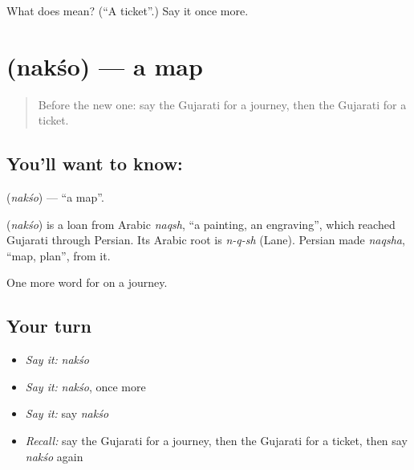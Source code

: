 \begin{tcolorbox}[breakable,colback=teal!4,colframe=teal!35!black,title={Before you move on}]
What does  mean? (\textquotedblleft{}A ticket\textquotedblright{}.) Say it once more.
\end{tcolorbox}
\section[\texorpdfstring{\gu{નકશો} (nakśo)}{નકશો (nakśo)}]{ (nakśo) — a map}

\label{lesson:GU-C86-map}



\begin{quote}
Before the new one: say the Gujarati for a journey, then the Gujarati for a ticket.
\end{quote}

\subsection*{You'll want to know: }
\textbf{} (\emph{nakśo}) — \textquotedblleft{}a map\textquotedblright{}.

\begin{cousinweb}
\textbf{} (\emph{nakśo}) is a loan from Arabic \emph{naqsh}, \textquotedblleft{}a painting, an engraving\textquotedblright{}, which reached Gujarati through Persian. Its Arabic root is \emph{n-q-sh} (Lane). Persian made \emph{naqsha}, \textquotedblleft{}map, plan\textquotedblright{}, from it.
\end{cousinweb}

\begin{grammarlens}[title={What you've built}]
One more word for on a journey.
\end{grammarlens}

\subsection*{Your turn}
\begin{itemize}
\raggedright
  \item \emph{Say it:} \emph{nakśo}
  \item \emph{Say it:} \emph{nakśo}, once more
  \item \emph{Say it:} say \emph{nakśo}
  \item \emph{Recall:} say the Gujarati for a journey, then the Gujarati for a ticket, then say \emph{nakśo} again
\end{itemize}

